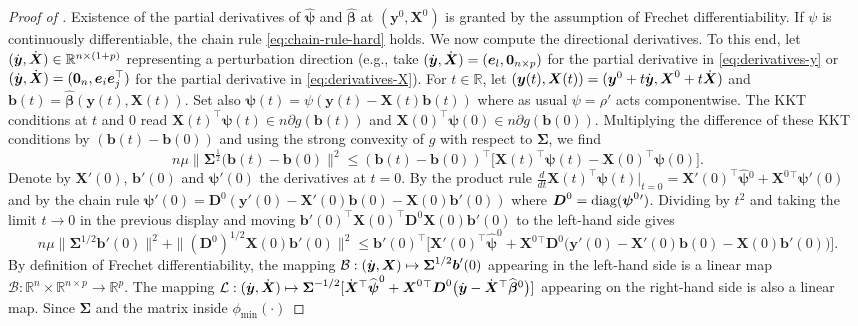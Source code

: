 \documentclass[11pt]{amsart}
\numberwithin{equation}{section}
\numberwithin{equation}{section}
\def\real{{\mathbb{R}}}
\def\R{{\real}}
\def\diag{\hbox{\rm diag}}
\def\mathbold{\boldsymbol} %
\def\bb{\mathbold{b}}\def\bhat{\widehat{b}}\def\btil{\widetilde{b}}
\def\bD{\mathbold{D}}\def\calD{{\cal D}}\def\scrD{{\mathscr D}}\def\Dhat{\widehat{D}}\def\Dtil{{\widetilde D}}
\def\be{\mathbold{e}}
\def\bX{\mathbold{X}}\def\hbX{{\widehat{\bX}}}\def\tbX{{\widetilde{\bX}}}\def\bXbar{{\overline \bX}}
\def\by{\mathbold{y}}\def\yhat{\widehat{y}}\def\ytil{\widetilde{y}}\def\ybar{{\overline y}}\def\vby{{\bf y}}
\def\bbeta{\mathbold{\beta}}\def\betahat{\widehat{\beta}}\def\hbeta{\widehat{\beta}}
\def\hbbeta{{{\widehat{\bbeta}}}}
\def\bSigma{\mathbold{\Sigma}}\def\hbSigma{{\widehat{\bSigma}}}
\def\bpsi{\mathbold{\psi}}\def\psihat{\widehat{\psi}}\def\hpsi{\widehat{\psi}}
\def\hbpsi{{\widehat{\bpsi}}}\def\tbpsi{{\widetilde{\bpsi}}}
\def\calD{{\cal D}}
\begin{document}
\begin{proof}[Proof of ]
    Existence of the partial derivatives of $\hbpsi$ and $\hbbeta$
    at $(\by^0,\bX^0)$ is granted by the assumption
    of Frechet differentiability. If $\psi$ is continuously differentiable,
    the chain rule
    \eqref{eq:chain-rule-hard}
    holds.
    We now compute the directional derivatives.
    To this end, let $(\dy,\dX)\in\R^{n\times(1+p)}$ representing a perturbation direction (e.g., take $(\dy,\dX)=(\be_l,\mathbf 0_{n\times p})$ for the partial derivative
    in \eqref{eq:derivatives-y} or 
    $(\dy,\dX)=(\mathbf 0_n,\be_i\be_j^\top)$
    for the partial
    derivative in \eqref{eq:derivatives-X}).
    For $t\in\R$, let
    $(\by(t),\bX(t)) = (\by^0 + t\dy, \bX^0 + t \dX )$ and
    $\bb(t) = \hbbeta(\by(t),\bX(t))$. Set also
    $\bpsi(t)=\psi(\by(t) - \bX(t)\bb(t))$
    where as usual $\psi=\rho'$ acts componentwise.
    The KKT conditions at $t$ and $0$ read
    $\bX(t)^\top \bpsi(t)
    \in n \partial g(\bb(t))$
    and 
    $\bX(0)^\top\bpsi(0) \in n \partial g(\bb(0))$.
    Multiplying the difference of these KKT conditions
    by $(\bb(t)-\bb(0))$ and using the strong convexity of $g$ with respect to $\bSigma$, we find
    $$
    n \mu \|\bSigma^{\frac12}(\bb(t)-\bb(0)\|^2 
    \le
    (\bb(t) - \bb(0))^\top
    \big[\bX(t)^\top\bpsi(t) - \bX(0)^\top\bpsi(0)
    \big].
    $$
    Denote by $\bX'(0)$, $\bb'(0)$ and $\bpsi'(0)$ the derivatives at $t=0$.
    By the product rule
    $\frac{d}{dt} \bX(t)^\top\bpsi(t)\big|_{t=0} = 
    \bX'(0)^\top\hbpsi{}^0 + \bX^0{}^\top\bpsi'(0)$ and by the chain rule
    $\bpsi'(0) = \bD^0(\by'(0) - \bX'(0)\bb(0) - \bX(0)\bb'(0))$
    where $\bD^0 = \diag(\bpsi^0{}')$.
    Dividing by $t^2$ and taking the limit $t\to 0$ in the previous display and moving $\bb'(0)^\top\bX(0)^\top \bD^0 \bX(0)\bb'(0)$ to the left-hand side gives
    $$
    n\mu \|\bSigma^{1/2}\bb'(0)\|^2
    + \|(\bD^0)^{1/2} \bX(0)\bb'(0)\|^2
    \le
    \bb'(0)^\top\bigl[
        \bX'(0)^\top\hbpsi^0 + \bX^0{}^\top\bD^0\bigl(\by'(0) - \bX'(0)\bb(0) - \bX(0)\bb'(0)\bigr)
    \bigr].
    $$
    By definition of Frechet differentiability,
    the mapping $\mathcal B: (\dy,\bX)\mapsto \bSigma^{1/2}\bb'(0)$
    appearing in the left-hand side
    is a linear map $\mathcal B: \R^n\times \R^{n\times p}\to \R^p$.
    The mapping
    $\mathcal L:(\dy,\dX)\mapsto
    \bSigma^{-1/2}[
    \dX{}^\top\hbpsi^0 + \bX^0{}^\top\bD^0\bigl(\dy - \dX{}^\top\hbbeta{}^0\bigr)
    ]$ appearing on the right-hand side is also a linear map.
    Since $\bSigma$ and the matrix inside $\phi_{\min}(\cdot)$

\end{proof}
\end{document}
